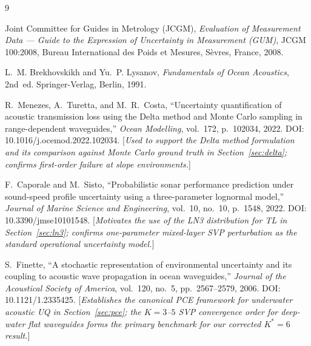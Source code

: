 \documentclass[11pt,a4paper]{article}
\begin{document}
\begin{thebibliography}{9}

Joint Committee for Guides in Metrology (JCGM),
\emph{Evaluation of Measurement Data --- Guide to the Expression of Uncertainty in Measurement (GUM)},
JCGM 100:2008, Bureau International des Poids et Mesures, S\`evres, France, 2008.

L.~M. Brekhovskikh and Yu.~P. Lysanov,
\emph{Fundamentals of Ocean Acoustics}, 2nd~ed.
Springer-Verlag, Berlin, 1991.

R.~Menezes, A.~Turetta, and M.~R.~Costa,
``Uncertainty quantification of acoustic transmission loss using the Delta method
and Monte Carlo sampling in range-dependent waveguides,''
\emph{Ocean Modelling}, vol.~172, p.~102034, 2022.
DOI: 10.1016/j.ocemod.2022.102034.
[\emph{Used to support the Delta method formulation and its comparison against Monte
Carlo ground truth in Section~\ref{sec:delta}; confirms first-order failure at
slope environments.}]

F.~Caporale and M.~Sisto,
``Probabilistic sonar performance prediction under sound-speed profile uncertainty
using a three-parameter lognormal model,''
\emph{Journal of Marine Science and Engineering}, vol.~10, no.~10, p.~1548, 2022.
DOI: 10.3390/jmse10101548.
[\emph{Motivates the use of the LN3 distribution for TL in Section~\ref{sec:ln3};
confirms one-parameter mixed-layer SVP perturbation as the standard operational
uncertainty model.}]

S.~Finette,
``A stochastic representation of environmental uncertainty and its coupling to
acoustic wave propagation in ocean waveguides,''
\emph{Journal of the Acoustical Society of America}, vol.~120, no.~5, pp.~2567--2579, 2006.
DOI: 10.1121/1.2335425.
[\emph{Establishes the canonical PCE framework for underwater acoustic UQ in
Section~\ref{sec:pce}; the $K=3$--$5$ SVP convergence order for deep-water flat
waveguides forms the primary benchmark for our corrected $K^*=6$ result.}]

\end{thebibliography}
\end{document}
